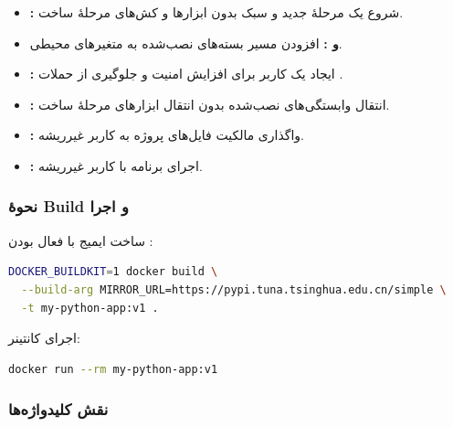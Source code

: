 \begin{itemize}
    \item \textbf{:}
    شروع یک مرحلهٔ جدید و سبک بدون ابزارها و کش‌های مرحلهٔ ساخت.

    \item \textbf{ و :}
    افزودن مسیر بسته‌های نصب‌شده به متغیرهای محیطی.

    \item \textbf{:}
    ایجاد یک کاربر  برای افزایش امنیت و جلوگیری از حملات .

    \item \textbf{:}
    انتقال وابستگی‌های نصب‌شده بدون انتقال ابزارهای مرحلهٔ ساخت.

    \item \textbf{:}
    واگذاری مالکیت فایل‌های پروژه به کاربر غیرریشه.

    \item \textbf{:}
    اجرای برنامه با کاربر غیرریشه.
\end{itemize}

\subsubsection*{نحوهٔ Build و اجرا}

ساخت ایمیج با فعال بودن :

\begin{latin}
\begin{lstlisting}[language=bash]
DOCKER_BUILDKIT=1 docker build \
  --build-arg MIRROR_URL=https://pypi.tuna.tsinghua.edu.cn/simple \
  -t my-python-app:v1 .
\end{lstlisting}
\end{latin}

اجرای کانتینر:

\begin{latin}
\begin{lstlisting}[language=bash]
docker run --rm my-python-app:v1
\end{lstlisting}
\end{latin}

\subsubsection*{نقش کلیدواژه‌ها}

